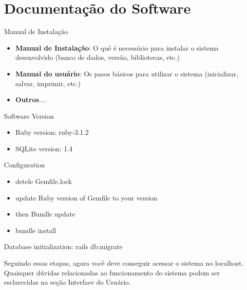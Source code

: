 \section{Documenta\c{c}\~{a}o do Software}

Manual de Instalação
\begin{itemize}
  \item \textbf{Manual de Instala\c{c}\~{a}o}: O qu\'{e} \'{e} necess\'{a}rio para instalar o sistema desenvolvido (banco de dados, vers\~{a}o, bibliotecas, etc.)
  \item \textbf{Manual do usu\'{a}rio}: Os pasos b\'{a}sicos para utilizar o sistema (inicializar, salvar, imprimir, etc.)
  \item \textbf{Outros}....
\end{itemize}
Software Version
\begin{itemize}
  \item Ruby version: ruby-3.1.2
  \item SQLite version:  1.4
\end{itemize}



Configuration
\begin{itemize}
  \item detele Gemfile.lock


  \item update Ruby version of Gemfile to your version


  \item then Bundle update
  \item bundle install

\end{itemize}

Database initialization:  rails db:migrate









Seguindo essas etapas, agora você deve conseguir acessar o sistema no localhost. Quaisquer dúvidas relacionadas ao funcionamento do sistema podem ser esclarecidas na seção Interface do Usuário.
